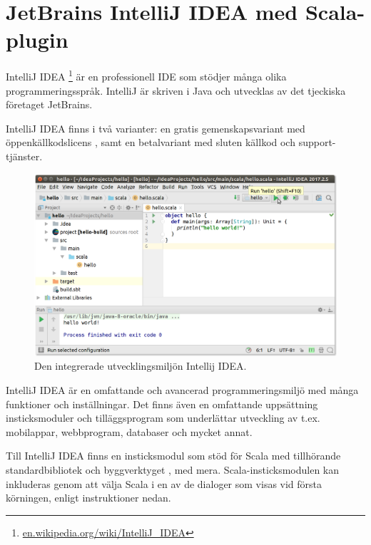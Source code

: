 
\section{JetBrains IntelliJ IDEA med Scala-plugin}\label{appendix:ide:intellij}

IntelliJ IDEA%
\footnote{\href{https://en.wikipedia.org/wiki/IntelliJ_IDEA}{en.wikipedia.org/wiki/IntelliJ\_IDEA}}
 är en professionell IDE som stödjer många olika programmeringsspråk. IntelliJ är skriven i Java och utvecklas av det tjeckiska företaget JetBrains.

IntelliJ IDEA finns i två varianter: en gratis gemenskapsvariant med öppenkällkodslicens , samt en betalvariant med sluten källkod och support-tjänster.

\begin{figure}
\centering
\includegraphics[width=1.0\textwidth]{../img/intellij/idea-hello}
\caption{Den integrerade utvecklingsmiljön Intellij IDEA.\label{appendix-ide:intellij-hello}}
\end{figure}



IntelliJ IDEA är en omfattande och avancerad programmeringsmiljö med många funktioner och inställningar. Det finns även en omfattande uppsättning insticksmoduler och tilläggsprogram som underlättar utveckling av t.ex. mobilappar, webbprogram, databaser och mycket annat.

Till IntelliJ IDEA finns en insticksmodul  som stöd för Scala med tillhörande standardbibliotek och byggverktyget , med mera. Scala-insticksmodulen kan inkluderas genom att välja Scala i en av de dialoger som visas vid första körningen, enligt instruktioner nedan.

